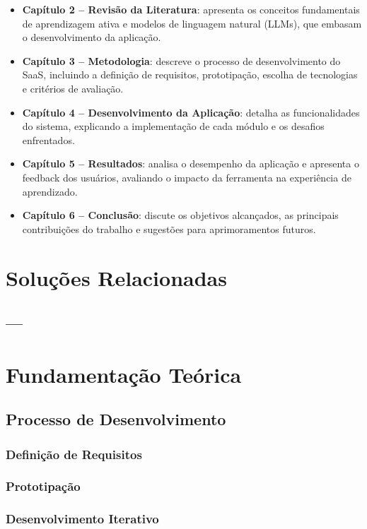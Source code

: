 \documentclass[tcc,capa]{texufpel}
\begin{document}
\begin{itemize}
    \item \textbf{Capítulo 2 – Revisão da Literatura}: apresenta os conceitos fundamentais de aprendizagem ativa e modelos de linguagem natural (LLMs), que embasam o desenvolvimento da aplicação.  
    \item \textbf{Capítulo 3 – Metodologia}: descreve o processo de desenvolvimento do SaaS, incluindo a definição de requisitos, prototipação, escolha de tecnologias e critérios de avaliação.  
    \item \textbf{Capítulo 4 – Desenvolvimento da Aplicação}: detalha as funcionalidades do sistema, explicando a implementação de cada módulo e os desafios enfrentados.  
    \item \textbf{Capítulo 5 – Resultados}: analisa o desempenho da aplicação e apresenta o feedback dos usuários, avaliando o impacto da ferramenta na experiência de aprendizado.  
    \item \textbf{Capítulo 6 – Conclusão}: discute os objetivos alcançados, as principais contribuições do trabalho e sugestões para aprimoramentos futuros.  
\end{itemize}




\chapter{Soluções Relacionadas}
\section{---}



\chapter{Fundamentação Teórica}
\section{Processo de Desenvolvimento}
\subsection{Definição de Requisitos}
\subsection{Prototipação}
\subsection{Desenvolvimento Iterativo}
\end{document}
